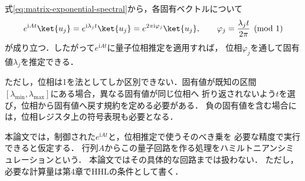 式\eqref{eq:matrix-exponential-spectral}から，各固有ベクトルについて
\begin{equation}
 e^{\mathrm{i}At}\ket{u_j}
 =e^{\mathrm{i}\lambda_jt}\ket{u_j}
 =e^{2\pi\mathrm{i}\varphi_j}\ket{u_j},
 \qquad
 \varphi_j=\frac{\lambda_jt}{2\pi}\pmod 1
 \label{eq:matrix-eigenvalue-to-phase}
\end{equation}
が成り立つ．したがって$e^{\mathrm{i}At}$に量子位相推定を適用すれば，
位相$\varphi_j$を通して固有値$\lambda_j$を推定できる．

ただし，位相は1を法としてしか区別できない．固有値が既知の区間
$[\lambda_{\min},\lambda_{\max}]$にある場合，異なる固有値が同じ位相へ
折り返されないよう$t$を選び，位相から固有値へ戻す規約を定める必要がある．
負の固有値を含む場合には，位相レジスタ上の符号表現も必要となる．

本論文では，制御された$e^{\mathrm{i}At}$と，位相推定で使うそのべき乗を
必要な精度で実行できると仮定する．
行列$A$からこの量子回路を作る処理をハミルトニアンシミュレーションという．
本論文ではその具体的な回路までは扱わない．
ただし，必要な計算量は第4章でHHLの条件として書く．
